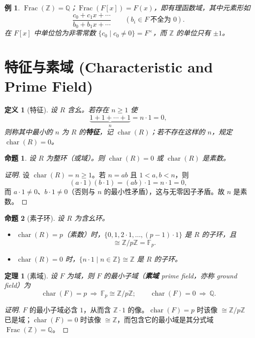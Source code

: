 \documentclass[11pt,a4paper]{ctexart}
\newtheorem*{theorem}{定理}
\newtheorem*{definition}{定义}
\newtheorem*{example}{例}
\newtheorem*{proposition}{命题}
\theoremstyle{remark}
\DeclareMathOperator{\Frac}{Frac}
\DeclareMathOperator{\chr}{char}
\newcommand{\Fp}{\mathbb{F}_p}
\begin{document}
\begin{example}
$\Frac(\mathbb{Z})=\mathbb{Q}$；$\Frac(F[x])=F(x)$，即有理函数域，其中元素形如
\[
\frac{c_0+c_1x+\cdots}{b_0+b_1x+\cdots}\qquad (b_i\in F\ \text{不全为 }0).
\]
在 $F[x]$ 中单位恰为非零常数 $\{c_0\mid c_0\neq 0\}=F^{\times}$，而 $\mathbb{Z}$ 的单位只有 $\pm 1$。
\end{example}

\section*{特征与素域 (Characteristic and Prime Field)}

\begin{definition}[特征]
设 $R$ 含幺。若存在 $n\ge 1$ 使
\[
\underbrace{1+1+\cdots+1}_{n}=n\cdot 1=0 ,
\]
则称其中最小的 $n$ 为 $R$ 的\textbf{特征}，记 $\chr(R)$；若不存在这样的 $n$，规定 $\chr(R)=0$。
\end{definition}

\begin{proposition}
设 $R$ 为整环（或域）。则 $\chr(R)=0$ 或 $\chr(R)$ 是素数。
\end{proposition}

\begin{proof}[证明]
设 $\chr(R)=n\ge 1$。若 $n=ab$ 且 $1<a,b<n$，则
\[
(a\cdot 1)(b\cdot 1)=(ab)\cdot 1=n\cdot 1=0 ,
\]
而 $a\cdot 1\neq 0$、$b\cdot 1\neq 0$（否则与 $n$ 的最小性矛盾），这与无零因子矛盾。故 $n$ 是素数。
\end{proof}

\begin{proposition}[素子环]
设 $R$ 为含幺环。
\begin{itemize}
    \item $\chr(R)=p$（素数）时，$\{0,1,2\cdot 1,\dots,(p-1)\cdot 1\}$ 是 $R$ 的子环，且
    \[
    \cong\mathbb{Z}/p\mathbb{Z}=\Fp .
    \]
    \item $\chr(R)=0$ 时，$\{n\cdot 1\mid n\in\mathbb{Z}\}\cong\mathbb{Z}$ 是 $R$ 的子环。
\end{itemize}
\end{proposition}

\begin{theorem}[素域]
设 $F$ 为域，则 $F$ 的最小子域（\textbf{素域} prime field，亦称 ground field）为
\[
\chr(F)=p\ \Longrightarrow\ \Fp\cong\mathbb{Z}/p\mathbb{Z};\qquad
\chr(F)=0\ \Longrightarrow\ \mathbb{Q}.
\]
\end{theorem}

\begin{proof}[证明]
$F$ 的最小子域必含 $1$，从而含 $\mathbb{Z}\cdot 1$ 的像。$\chr(F)=p$ 时该像 $\cong\mathbb{Z}/p\mathbb{Z}$ 已是域；$\chr(F)=0$ 时该像 $\cong\mathbb{Z}$，而包含它的最小域是其分式域 $\Frac(\mathbb{Z})=\mathbb{Q}$。
\end{proof}
\end{document}
